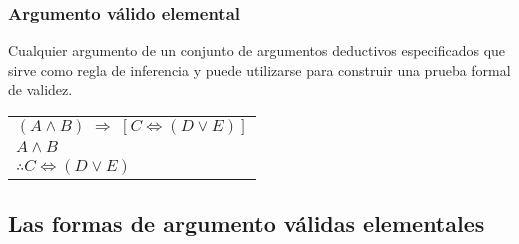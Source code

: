 \documentclass[10pt]{book} 						%
\begin{document}
\subsubsection{Argumento válido elemental}
Cualquier argumento de un conjunto de argumentos deductivos especificados que sirve como regla de inferencia y puede utilizarse para construir una prueba formal de validez.
\begin{center}
\begin{tabular}{l}
$(A \land B) \; \Rightarrow \;[ C \Leftrightarrow(D \lor E)]$\\
$A \land B$\\
\hline
$\therefore C \Leftrightarrow (D \lor E)$\\
\end{tabular}
\end{center}
\subsection{Las formas de argumento válidas elementales}
\end{document}
